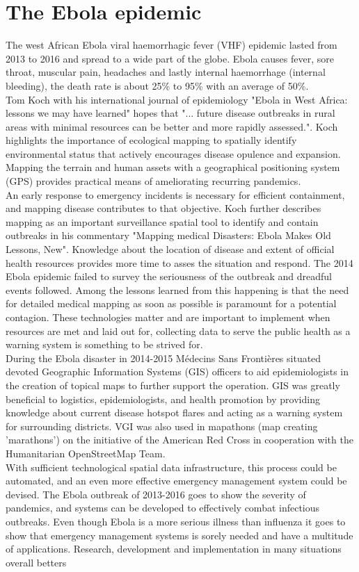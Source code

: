 \section{The Ebola epidemic}
The west African Ebola viral haemorrhagic fever (VHF) epidemic lasted from 2013 to 2016 and spread to a wide part of the globe. Ebola causes fever, sore throat, muscular pain, headaches and lastly internal haemorrhage (internal bleeding), the death rate is about 25\% to 95\% with an average of 50\%\cite{who_ebola}. \\Tom Koch\cite{koch2016ebola} with his international journal of epidemiology "Ebola in West Africa: lessons we may have learned" hopes that "... future disease outbreaks in rural areas with minimal resources can be better and more rapidly assessed.". Koch highlights the importance of ecological mapping to spatially identify environmental status that actively encourages disease opulence and expansion. Mapping the terrain and human assets with a geographical positioning system (GPS) provides practical means of ameliorating recurring pandemics. \\An early response to emergency incidents is necessary for efficient containment, and mapping disease contributes to that objective. Koch further describes mapping as an important surveillance spatial tool to identify and contain outbreaks in his commentary "Mapping medical Disasters: Ebola Makes Old Lessons, New"\cite{koch2015mapping}. Knowledge about the location of disease and extent of official health resources provides more time to asses the situation and respond. The 2014 Ebola epidemic failed to survey the seriousness of the outbreak and dreadful events followed. Among the lessons learned from this happening is that the need for detailed medical mapping as soon as possible is paramount for a potential contagion. These technologies matter and are important to implement when resources are met and laid out for, collecting data to serve the public health as a warning system is something to be strived for.\\ During the Ebola disaster in 2014-2015 Médecins Sans Frontières\cite{gis_support} situated devoted Geographic Information Systems (GIS) officers to aid epidemiologists in the creation of topical maps to further support the operation. GIS was greatly beneficial to logistics, epidemiologists, and health promotion by providing knowledge about current disease hotspot flares and acting as a warning system for surrounding districts. VGI was also used\cite{moeller2015mapping} in mapathons (map creating 'marathons') on the initiative of the American Red Cross in cooperation with the Humanitarian OpenStreetMap Team.\\ With sufficient technological spatial data infrastructure, this process could be automated, and an even more effective emergency management system could be devised. The Ebola outbreak of 2013-2016 goes to show the severity of pandemics, and systems can be developed to effectively combat infectious outbreaks. Even though Ebola is a more serious illness than influenza it goes to show that emergency management systems is sorely needed and have a multitude of applications. Research, development and implementation in many situations overall betters 